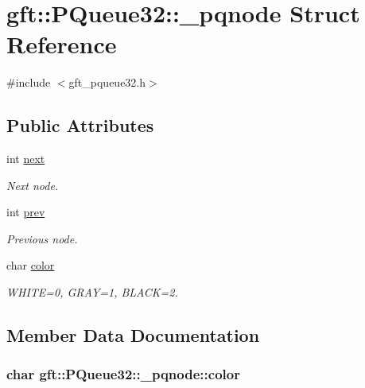 \hypertarget{structgft_1_1PQueue32_1_1__pqnode}{}\section{gft\+:\+:P\+Queue32\+:\+:\+\_\+pqnode Struct Reference}
\label{structgft_1_1PQueue32_1_1__pqnode}


{\ttfamily \#include $<$gft\+\_\+pqueue32.\+h$>$}

\subsection*{Public Attributes}
\begin{DoxyCompactItemize}
\item 
int \hyperlink{structgft_1_1PQueue32_1_1__pqnode_a044ff40f8cd925b0269ebada823fbc0c}{next}
\begin{DoxyCompactList}\small\item\em Next node. \end{DoxyCompactList}\item 
int \hyperlink{structgft_1_1PQueue32_1_1__pqnode_a2a10c5ab969878d64e00c1a272c55a42}{prev}
\begin{DoxyCompactList}\small\item\em Previous node. \end{DoxyCompactList}\item 
char \hyperlink{structgft_1_1PQueue32_1_1__pqnode_ab5d0e47679597dc75cd13a9dcff56dca}{color}
\begin{DoxyCompactList}\small\item\em W\+H\+I\+TE=0, G\+R\+AY=1, B\+L\+A\+CK=2. \end{DoxyCompactList}\end{DoxyCompactItemize}


\subsection{Member Data Documentation}
\subsubsection[{\texorpdfstring{color}{color}}]{\setlength{\rightskip}{0pt plus 5cm}char gft\+::\+P\+Queue32\+::\+\_\+pqnode\+::color}\hypertarget{structgft_1_1PQueue32_1_1__pqnode_ab5d0e47679597dc75cd13a9dcff56dca}{}\label{structgft_1_1PQueue32_1_1__pqnode_ab5d0e47679597dc75cd13a9dcff56dca}


